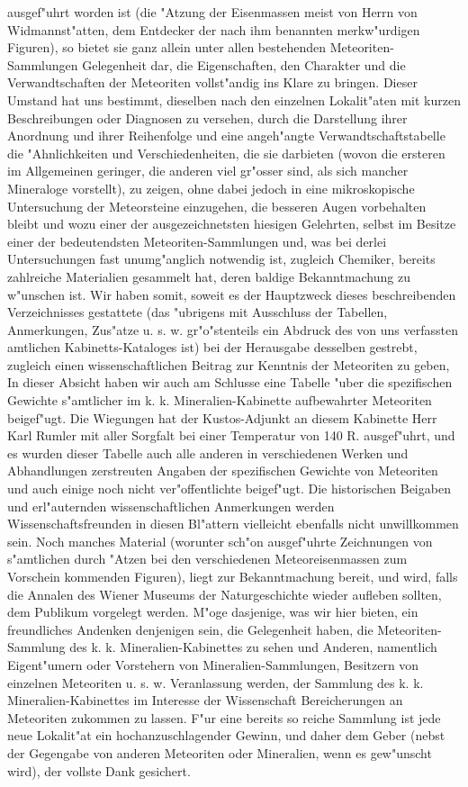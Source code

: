 \documentclass[a4paper, 11pt, oneside, polutonikogreek, german]{article}
\begin{document}
ausgef"uhrt worden ist (die "Atzung der Eisenmassen meist von Herrn von Widmannst"atten, dem Entdecker der nach ihm benannten merkw"urdigen Figuren), so bietet sie ganz allein unter allen bestehenden Meteoriten-Sammlungen Gelegenheit dar, die Eigenschaften, den Charakter und die Verwandtschaften der Meteoriten vollst"andig ins Klare zu bringen. Dieser Umstand hat uns bestimmt, dieselben nach den einzelnen Lokalit"aten mit kurzen Beschreibungen oder Diagnosen zu versehen, durch die Darstellung ihrer Anordnung und ihrer Reihenfolge und eine angeh"angte Verwandtschaftstabelle die "Ahnlichkeiten und Verschiedenheiten, die sie darbieten (wovon die ersteren im Allgemeinen geringer, die anderen viel gr"osser sind, als sich mancher Mineraloge vorstellt), zu zeigen, ohne dabei jedoch in eine mikroskopische Untersuchung der Meteorsteine einzugehen, die besseren Augen vorbehalten bleibt und wozu einer der ausgezeichnetsten hiesigen Gelehrten, selbst im Besitze einer der bedeutendsten Meteoriten-Sammlungen und, was bei derlei Untersuchungen fast unumg"anglich notwendig ist, zugleich Chemiker, bereits zahlreiche Materialien gesammelt hat, deren baldige Bekanntmachung zu w"unschen ist. Wir haben somit, soweit es der Hauptzweck dieses beschreibenden Verzeichnisses gestattete (das "ubrigens mit Ausschluss der Tabellen, Anmerkungen, Zus"atze u. s. w. gr"o"stenteils ein Abdruck des von uns verfassten amtlichen Kabinetts-Kataloges ist) bei der Herausgabe desselben gestrebt, zugleich einen wissenschaftlichen Beitrag zur Kenntnis der Meteoriten zu geben, In dieser Absicht haben wir auch am Schlusse eine Tabelle "uber die spezifischen Gewichte s"amtlicher im k. k. Mineralien-Kabinette aufbewahrter Meteoriten beigef"ugt. Die Wiegungen hat der Kustos-Adjunkt an diesem Kabinette Herr Karl Rumler mit aller Sorgfalt bei einer Temperatur von 140 R. ausgef"uhrt, und es wurden dieser Tabelle auch alle anderen in verschiedenen Werken und Abhandlungen zerstreuten Angaben der spezifischen Gewichte von Meteoriten und auch einige noch nicht ver"offentlichte beigef"ugt. Die historischen Beigaben und erl"auternden wissenschaftlichen Anmerkungen werden Wissenschaftsfreunden in diesen Bl"attern vielleicht ebenfalls nicht unwillkommen sein. Noch manches Material (worunter sch"on ausgef"uhrte Zeichnungen von s"amtlichen durch "Atzen bei den verschiedenen Meteoreisenmassen zum Vorschein kommenden Figuren), liegt zur Bekanntmachung bereit, und wird, falls die Annalen des Wiener Museums der Naturgeschichte wieder aufleben sollten, dem Publikum vorgelegt werden. M"oge dasjenige, was wir hier bieten, ein freundliches Andenken denjenigen sein, die Gelegenheit haben, die Meteoriten-Sammlung des k. k. Mineralien-Kabinettes zu sehen und Anderen, namentlich Eigent"umern oder Vorstehern von Mineralien-Sammlungen, Besitzern von einzelnen Meteoriten u. s. w. Veranlassung werden, der Sammlung des k. k. Mineralien-Kabinettes im Interesse der Wissenschaft Bereicherungen an Meteoriten zukommen zu lassen. F"ur eine bereits so reiche Sammlung ist jede neue Lokalit"at ein hochanzuschlagender Gewinn, und daher dem Geber (nebst der Gegengabe von anderen Meteoriten oder Mineralien, wenn es gew"unscht wird), der vollste Dank gesichert.
\end{document}
